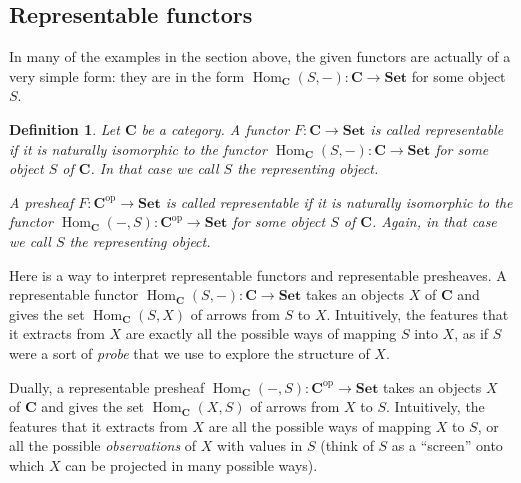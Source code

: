 \documentclass[12pt,oneside]{scrbook}
\numberwithin{equation}{section}
\theoremstyle{plain}
\newtheorem{deph}[thm]{Definition}
\theoremstyle{definition}
\DeclareMathOperator{\Hom}{Hom}
\newcommand{\cat}[1]{{\mathbf{#1}}} %
\newcommand{\op}{\mathrm{op}} %
\newcommand{\Set}{\cat{Set}}
\DeclareMathOperator{\1}{\mathbbm{1}}
\DeclareMathOperator{\2}{\mathbbm{2}}
\begin{document}
\subsection{Representable functors}

In many of the examples in the section above, the given functors are actually of a very simple form: they are in the form $\Hom_\cat{C}(S,-):\cat{C}\to\Set$ for some object $S$. 

\begin{deph}
 Let $\cat{C}$ be a category. A functor $F:\cat{C}\to\Set$ is called \emph{representable} if it is naturally isomorphic to the functor $\Hom_\cat{C}(S,-):\cat{C}\to\Set$ for some object $S$ of $\cat{C}$. In that case we call $S$ the \emph{representing object}. 
 
 A presheaf $F:\cat{C}^\op\to\Set$ is called \emph{representable} if it is naturally isomorphic to the functor $\Hom_\cat{C}(-,S):\cat{C}^\op\to\Set$ for some object $S$ of $\cat{C}$. Again, in that case we call $S$ the \emph{representing object}. 
\end{deph}

Here is a way to interpret representable functors and representable presheaves. 
A representable functor $\Hom_\cat{C}(S,-):\cat{C}\to\Set$ takes an objects $X$ of $\cat{C}$ and gives the set $\Hom_\cat{C}(S,X)$ of arrows from $S$ to $X$. Intuitively, the features that it extracts from $X$ are exactly all the possible ways of mapping $S$ into $X$, as if $S$ were a sort of \emph{probe} that we use to explore the structure of $X$.

Dually, a representable presheaf $\Hom_\cat{C}(-,S):\cat{C}^\op\to\Set$ takes an objects $X$ of $\cat{C}$ and gives the set $\Hom_\cat{C}(X,S)$ of arrows from $X$ to $S$. Intuitively, the features that it extracts from $X$ are all the possible ways of mapping $X$ to $S$, or all the possible \emph{observations} of $X$ with values in $S$ (think of $S$ as a ``screen'' onto which $X$ can be projected in many possible ways). 
\end{document}
